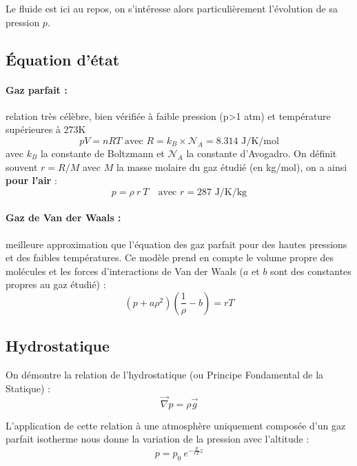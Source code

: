 
Le fluide est ici au repos, on s'intéresse alors particulièrement l'évolution de sa pression $p$.


\subsection{Équation d'état}
\paragraph{Gaz parfait :}relation très célèbre, bien vérifiée à faible pression (p>1 atm) et température supérieures à 273K
%
\begin{equation}
pV = nRT \text{ avec } R = k_B \times \mathcal{N}_A = 8.314 \text{ J/K/mol}
\end{equation}
%
avec $k_B$ la constante de Boltzmann et $\mathcal{N}_A$ la constante d'Avogadro. On définit souvent $r = R/M$ avec $M$ la masse molaire du gaz étudié (en kg/mol), on a ainsi \textbf{pour l'air} :
%
\begin{equation}
p = \rho~r~T \quad\text{avec } r = 287 \text{ J/K/kg}
\end{equation}

\paragraph{Gaz de Van der Waals :}meilleure approximation que l'équation des gaz parfait pour des hautes pressions et des faibles températures. Ce modèle prend en compte le volume propre des molécules et les forces d'interactions de Van der Waals ($a$ et $b$ sont des constantes propres au gaz étudié) :
%
\begin{equation}
\left( p + a\rho^2 \right) \left( \frac{1}{\rho} - b \right) = rT
\end{equation}


\subsection{Hydrostatique}
On démontre la relation de l'hydrostatique (ou Principe Fondamental de la Statique) :
%
\begin{equation}
\vec{\nabla} p = \rho \vec{g}
\label{eq:PFS}
\end{equation}

L'application de cette relation à une atmosphère uniquement composée d'un gaz parfait isotherme nous donne la variation de la pression avec l'altitude :
%
\begin{equation}
p = p_0~e^{-\frac{g}{rT}z}
\end{equation}

